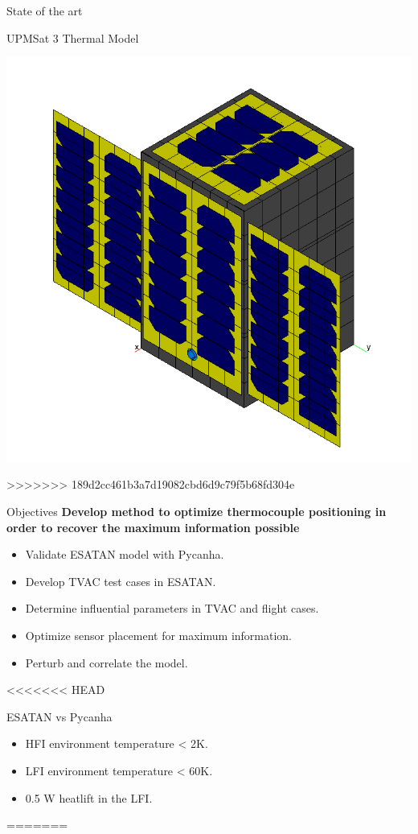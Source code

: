 \documentclass{cubeamer}
\begin{document}
\begin{frame}{State of the art}
\begin{minipage}{0.65\textwidth}
\begin{frame}{UPMSat 3 Thermal Model}
\begin{minipage}{0.5\textwidth}
\begin{flushright}
        \includegraphics[width=0.9\linewidth]{Figures/UPMSAT3-esatan.png}
    \end{flushright} 
>>>>>>> 189d2cc461b3a7d19082cbd6d9c79f5b68fd304e
    \end{minipage}
\end{frame}

\begin{frame}{Objectives}
\textbf{Develop method to optimize thermocouple positioning in order to recover the maximum information possible}
    \begin{itemize}
        \item Validate ESATAN model with Pycanha.
        \item Develop TVAC test cases in ESATAN.
        \item Determine influential parameters in TVAC and flight cases.
        \item Optimize sensor placement for maximum information.
        \item Perturb and correlate the model.
    \end{itemize}
\end{frame}


<<<<<<< HEAD
\begin{frame}{ESATAN vs Pycanha}


   \begin{itemize}
   \item HFI environment temperature < 2K.
   \item LFI environment temperature < 60K.
   \item 0.5 W heatlift in the LFI.
   \end{itemize}
=======

\end{frame}
\end{minipage}
\end{frame}
\end{document}
